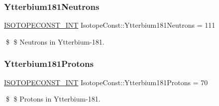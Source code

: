\subsubsection{\texorpdfstring{Ytterbium181\+Neutrons}{Ytterbium181Neutrons}}
{\footnotesize\ttfamily \mbox{\hyperlink{group___isotope_const-_macros_ga5f18360b3e99483a35c32d789e62621c}{I\+S\+O\+T\+O\+P\+E\+C\+O\+N\+S\+T\+\_\+\+I\+NT}} Isotope\+Const\+::\+Ytterbium181\+Neutrons = 111}

\$ \$ Neutrons in Ytterbium-\/181. \mbox{\label{group___isotope_const-_ytterbium-_yb181_ga43ce584b3fa170a3f5cf3875549569de}} 
\subsubsection{\texorpdfstring{Ytterbium181\+Protons}{Ytterbium181Protons}}
{\footnotesize\ttfamily \mbox{\hyperlink{group___isotope_const-_macros_ga5f18360b3e99483a35c32d789e62621c}{I\+S\+O\+T\+O\+P\+E\+C\+O\+N\+S\+T\+\_\+\+I\+NT}} Isotope\+Const\+::\+Ytterbium181\+Protons = 70}

\$ \$ Protons in Ytterbium-\/181. 